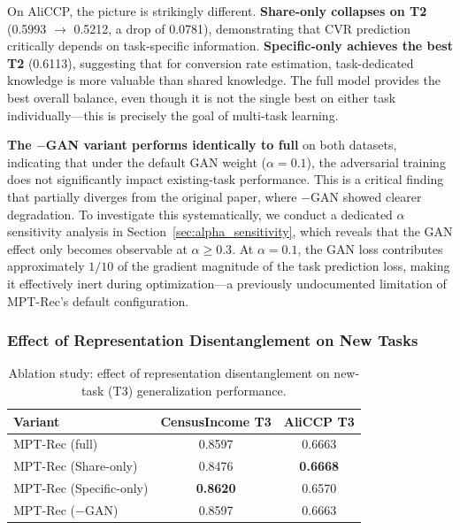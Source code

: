 \documentclass[review,anonymous]{acmart}
\begin{document}
On AliCCP, the picture is strikingly different. \textbf{Share-only collapses on
T2} (0.5993 $\rightarrow$ 0.5212, a drop of 0.0781), demonstrating that CVR
prediction critically depends on task-specific information. \textbf{Specific-only
achieves the best T2} (0.6113), suggesting that for conversion rate estimation,
task-dedicated knowledge is more valuable than shared knowledge. The full model
provides the best overall balance, even though it is not the single best on
either task individually---this is precisely the goal of multi-task learning.

\textbf{The $-$\!GAN variant performs identically to full} on both datasets,
indicating that under the default GAN weight ($\alpha = 0.1$), the adversarial
training does not significantly impact existing-task performance. This is a
critical finding that partially diverges from the original paper, where $-$\!GAN
showed clearer degradation. To investigate this systematically, we conduct a
dedicated $\alpha$ sensitivity analysis in Section~\ref{sec:alpha_sensitivity},
which reveals that the GAN effect only becomes observable at $\alpha \geq 0.3$.
At $\alpha = 0.1$, the GAN loss contributes approximately $1/10$ of the gradient
magnitude of the task prediction loss, making it effectively inert during
optimization---a previously undocumented limitation of MPT-Rec's default
configuration.

\subsubsection{Effect of Representation Disentanglement on New Tasks}

\begin{table}[t]
  \centering
  \caption{Ablation study: effect of representation disentanglement on new-task
           (T3) generalization performance.}
  \label{tab:ablation_new}
  \begin{tabular}{lcc}
    \toprule
    \textbf{Variant} & \textbf{CensusIncome T3} & \textbf{AliCCP T3} \\
    \midrule
    MPT-Rec (full)           & 0.8597 & 0.6663 \\
    MPT-Rec (Share-only)     & 0.8476 & \textbf{0.6668} \\
    MPT-Rec (Specific-only)  & \textbf{0.8620} & 0.6570 \\
    MPT-Rec ($-$GAN)         & 0.8597 & 0.6663 \\
    \bottomrule
  \end{tabular}
\end{table}
\end{document}

